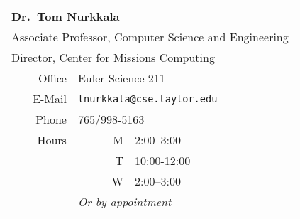 \begin{center}
  \begin{tabular}{rrl}
    \toprule
    \multicolumn{3}{l}{\textbf{Dr.\ Tom Nurkkala}}                            \\
    \multicolumn{3}{l}{Associate Professor, Computer Science and Engineering} \\
    \multicolumn{3}{l}{Director, Center for Missions Computing}               \\
    \midrule
    Office & \multicolumn{2}{l}{Euler Science 211}                            \\
    E-Mail & \multicolumn{2}{l}{\texttt{tnurkkala@cse.taylor.edu}}            \\
    Phone  & \multicolumn{2}{l}{765/998-5163}                                 \\
    Hours  & M & 2:00--3:00                                                   \\
           & T & 10:00-12:00                                                  \\
           & W & 2:00--3:00                                                   \\
           & \multicolumn{2}{l}{\emph{Or by appointment}}                     \\
    \bottomrule
  \end{tabular}
\end{center}


